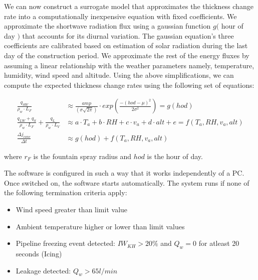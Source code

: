 \documentclass[tc, manuscript]{copernicus}
\begin{document}
We can now construct a surrogate model that approximates the thickness change rate into a computationally
inexpensive equation with fixed coefficients. We approximate the shortwave radiation flux using a gaussian
function $g($ hour of day $)$ that accounts for its diurnal variation. The gaussian equation's three 
coefficients are calibrated based on estimation of solar radiation during the last day of the construction
period. We approximate the rest of the energy fluxes by assuming a linear relationship with the weather
parameters namely, temperature, humidity, wind speed and altitude. Using the above simplifications, we can
compute the expected thickness change rates using the following set of equations:

\begin{subequations}
	\begin{align}
		\label{eqn:sun}
  \frac{q_{SW}}{\rho_w \cdot L_F} & \approx \frac{amp}{(\sigma \sqrt{2\pi})} \cdot
  exp\left(\frac{-(hod-\mu)^2}{2\sigma^2}\right) = g(hod)  \\
		\label{eqn:T}
   \frac{q_{LW} + q_{S}}{\rho_w \cdot L_F} + \frac{q_L}{\rho_w \cdot L_V} & \approx a \cdot T_a + b \cdot RH + c \cdot v_a +
  d \cdot alt + e = f(T_a, RH, v_a, alt) \\
		\label{eqn:auto}
  \frac{\Delta j_{cone}}{\Delta t} & \approx g(hod) + f(T_a, RH, v_a, alt)
	\end{align}
\end{subequations}

where $r_F$ is the fountain spray radius and $hod$ is the hour of day.


The software is configured in such a way that it works independently of a PC. Once switched on, the software
starts automatically. The system runs if none of the following termination criteria apply:

\begin{itemize}
\item Wind speed greater than limit value
\item Ambient temperature higher or lower than limit values
\item Pipeline freezing event detected: $IW_{KH} > 20 \%$ and $Q_w = 0$ for atleast 20 seconds (Icing)
\item Leakage detected: $Q_w > 65 l/min$
\end{itemize}
\end{document}
